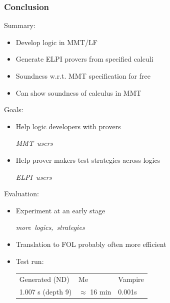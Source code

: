 \documentclass{beamer}
\newcommand{\com}[1]{\strut\hfil\strut\null\nobreak\hfill\hbox{{\itshape \color{black!50}#1}}\par}
\begin{document}
    
\begin{frame}[fragile]
    \frametitle{Conclusion}
    Summary:

    \begin{itemize}
        \item Develop logic in MMT/LF 
        \item Generate ELPI provers from specified calculi
        \item Soundness w.r.t. MMT specification for free
        \item Can show soundness of calculus in MMT
    \end{itemize}

    \vspace{1em}
    Goals:
    \begin{itemize}
        \item Help logic developers with provers \com{MMT users}
        \item Help prover makers test strategies across logics \com{ELPI users}
    \end{itemize}

    \vspace{1em}
    Evaluation:
    \begin{itemize}
        \item Experiment at an early stage \com{more logics, strategies}
        \item Translation to FOL probably often more efficient 
        \item Test run: { \footnotesize
            \begin{tabular}{l l l}
                Generated (ND) & Me & Vampire\\
                1.007 s (depth 9) & $\approx$ 16 min & 0.001s
            \end{tabular}
        }
    \end{itemize}

%     

\end{frame}
\end{document}
